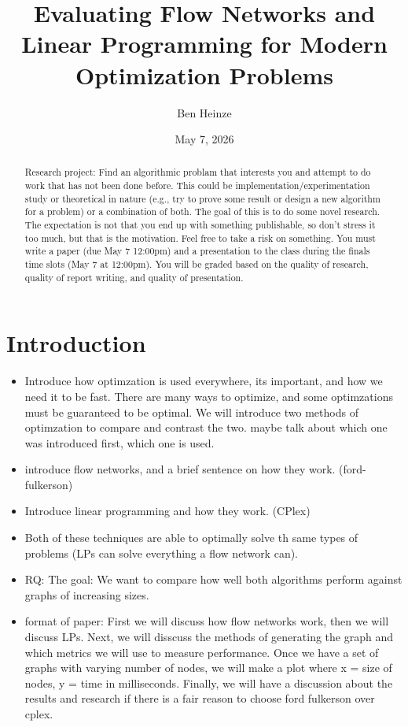 \documentclass[11pt]{article}
\author{Ben Heinze}
\date{May 7, 2026}
\title{Evaluating Flow Networks and Linear Programming for Modern Optimization Problems}
\begin{document}
\maketitle
\begin{abstract}

Research project: Find an algorithmic problam that interests you and attempt to do work that has not been done before. This could be implementation/experimentation study or theoretical in nature (e.g., try to prove some result or design a new algorithm for a problem) or a combination of both. The goal of this is to do some novel research. The expectation is not that you end up with something publishable, so don't stress it too much, but that is the motivation. Feel free to take a risk on something. You must write a paper (due May 7 12:00pm) and a presentation to the class during the finals time slots (May 7 at 12:00pm). You will be graded based on the quality of research, quality of report writing, and quality of presentation. 

\end{abstract}

\section{Introduction}
\label{sec:orgf406170}


\begin{itemize}
	\item Introduce how optimzation is used everywhere, its important, and how we need it to be fast. There are many ways to optimize, and some optimzations must be guaranteed to be optimal. We will introduce two methods of optimzation to compare and contrast the two. maybe talk about which one was introduced first, which one is used. 
	\item introduce flow networks, and a brief sentence on how they work. (ford-fulkerson)
	\item Introduce linear programming and how they work. (CPlex)
	\item Both of these techniques are able to optimally solve th same types of problems (LPs can solve everything a flow network can).
	\item RQ: The goal: We want to compare how well both algorithms perform against graphs of increasing sizes.
	\item format of paper: First we will discuss how flow networks work, then we will discuss LPs. Next, we will disscuss the methods of generating the graph and which metrics we will use to measure performance. Once we have a set of graphs with varying number of nodes, we will make a plot where x = size of nodes, y = time in milliseconds. Finally, we will have a discussion about the results and research if there is a fair reason to choose ford fulkerson over cplex. 
\end{itemize}
\end{document}
